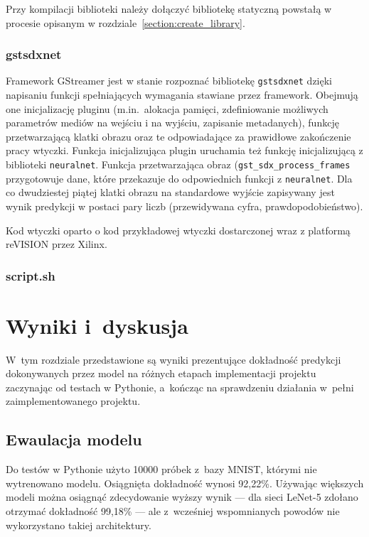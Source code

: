\documentclass[12pt, oneside, a4paper]{article}
\begin{document}
Przy kompilacji biblioteki należy dołączyć bibliotekę statyczną
powstałą w procesie opisanym w rozdziale~\ref{section:create_library}.

\subsubsection{gstsdxnet}
Framework GStreamer jest w stanie rozpoznać bibliotekę \lstinline{gstsdxnet}
dzięki napisaniu funkcji spełniających wymagania stawiane przez framework.
Obejmują one inicjalizację pluginu (m.in.~alokacja pamięci, zdefiniowanie
możliwych parametrów mediów na wejściu i na wyjściu, zapisanie
metadanych), funkcję
przetwarzającą klatki obrazu oraz te odpowiadające za prawidłowe zakończenie
pracy wtyczki. Funkcja inicjalizująca plugin uruchamia też funkcję
inicjalizującą z biblioteki \lstinline{neuralnet}.
Funkcja przetwarzająca obraz (\lstinline{gst_sdx_process_frames}
przygotowuje dane, które przekazuje do
odpowiednich funkcji z \lstinline{neuralnet}. Dla co dwudziestej piątej
klatki obrazu na standardowe wyjście zapisywany jest wynik predykcji
w postaci pary liczb (przewidywana cyfra, prawdopodobieństwo). 

Kod wtyczki oparto o kod przykładowej wtyczki dostarczonej wraz
z platformą reVISION przez Xilinx.

\subsubsection{script.sh}


\newpage
\section{Wyniki i~dyskusja}
W~tym rozdziale przedstawione są wyniki prezentujące dokładność
predykcji dokonywanych przez model na różnych etapach implementacji
projektu zaczynając od testach w Pythonie, a~kończąc na sprawdzeniu
działania w~pełni zaimplementowanego projektu.

\subsection{Ewaulacja modelu}
Do testów w Pythonie użyto 10000 próbek z~bazy MNIST, którymi nie
wytrenowano modelu. Osiągnięta dokładność wynosi 92,22\%. Używając większych
modeli można osiągnąć zdecydowanie wyższy wynik --- dla sieci \mbox{LeNet-5}
zdołano otrzymać dokładność 99,18\% --- ale z~wcześniej
wspomnianych powodów nie wykorzystano takiej architektury.
\end{document}
